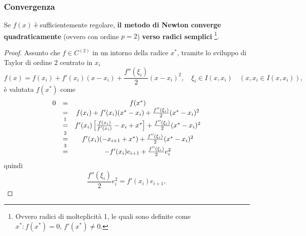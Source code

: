 \subsubsection{Convergenza}
\begin{theorem}\label{th:metodo_newton_converge_quadraticamente}
	Se $f(x)$ è sufficientemente regolare, \textbf{il metodo di Newton converge quadraticamente} (ovvero con ordine $p=2$) \textbf{verso radici semplici} \footnote{Ovvero radici di molteplicità 1, le quali sono definite come $x^*:f(x^*)=0,\, f'(x^*)\neq 0$.}.
\end{theorem}
\begin{proof}
	Assunto che $f\in C^{(2)}$ in un intorno della radice $x^*$, tramite lo sviluppo di Taylor di ordine 2 centrato in $x_i$
	\begin{equation*}
		f(x)=f(x_i)+f'(x_i)(x-x_i)+\frac{f''(\xi_i)}{2}(x-x_i)^2, \quad \xi_i \in I(x,x_i)\quad (x,x_i\in I(x,x_i)),
	\end{equation*}
	è valutata $f(x^*)$ come
	\begin{equation*}
		\begin{matrix}
			0 & =& {f(x^*})\\
			& =& {f(x_i)+f'(x_i)(x^*-x_i)+\frac{f''(\xi_i)}{2}(x^*-x_i)^2} \\
			&\overset{\footnotemark}{=}& {f'(x_i)\left[\frac{f(x_i)}{f'(x_i)}-x_i+x^*\right]+\frac{f''(\xi_i)}{2}(x^*-x_i)^2}\\
			&\overset{\footnotemark}{=}&f'(x_i)(-x_{i+1}+x^*)+\frac{f''(\xi_i)}{2}(x^*-x_i)^2\\
			&\overset{\footnotemark}{=}&-f'(x_i)e_{i+1}+\frac{f''(\xi_i)}{2}e_i^2
		\end{matrix}
	\end{equation*}
	quindi 
	\begin{equation*}
		\frac{f''(\xi_i)}{2}e_i^2 = f'(x_i)e_{i+1},
	\end{equation*}
	\addtocounter{footnote}{-3}
	
	
	

\end{proof}
